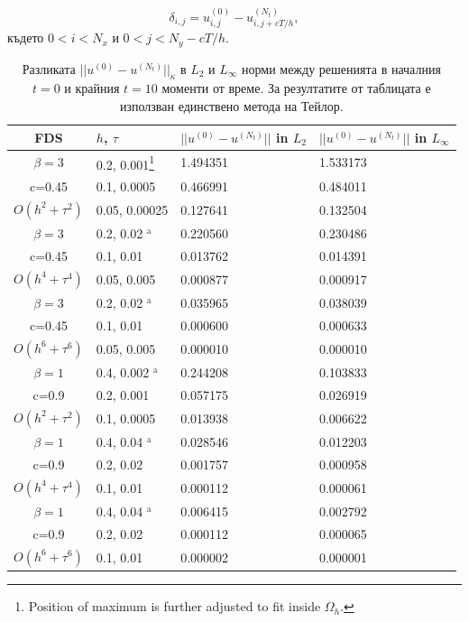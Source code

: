 \documentclass{article}
\begin{document}
$$ \delta_{i,j} = u_{i,j}^{(0)} - u_{i,j+cT/h}^{(N_t)},$$
където $0 < i < N_x$ и $0 < j < N_y - cT/h$. 
\begin{table}[ht]
\centering
\small
		\begin{tabular}{||c|l|l|l||}
			\hline
			\hline
      FDS        & $h$, $\tau$  & $||u^{(0)} - u^{(N_t)}||$ in $L_2$  & $||u^{(0)} - u^{(N_t)}||$ in $L_\infty$   \\
   		\hline 
			\hline
  $\beta=3$                &0.2, 0.001\footnote{Position of maximum is further adjusted to fit inside $\Omega_h$.}            & 1.494351 & 1.533173    \\
   c=0.45                     &0.1, 0.0005          & 0.466991 & 0.484011       \\
     $O(h^2 + \tau^ 2)$ &0.05, 0.00025   & 0.127641 & 0.132504      \\
			\hline 
  $\beta=3$               &0.2, 0.02 $^{\text{a}}$      &0.220560 & 0.230486       \\
   c=0.45                    &0.1, 0.01      &0.013762 & 0.014391        \\
     $O(h^4+ \tau^4)$ &0.05, 0.005&0.000877 & 0.000917         \\
			\hline 
  $\beta=3$               &0.2, 0.02 $^{\text{a}}$       &  0.035965 & 0.038039        \\
     c=0.45                 &0.1, 0.01        &0.000600 & 0.000633       \\
     $O(h^6+ \tau^6)$ &0.05, 0.005 &0.000010 & 0.000010          \\
	   \hline
			\hline 
       $\beta=1$       &0.4, 0.002 $^{\text{a}}$       & 0.244208 & 0.103833 \\
                  c=0.9    &0.2, 0.001       &  0.057175 & 0.026919  \\
  $O(h^2+ \tau^2)$ &0.1, 0.0005   & 0.013938 & 0.006622  \\
			\hline
      $\beta=1$               &0.4, 0.04 $^{\text{a}}$    &0.028546 & 0.012203 \\
       c=0.9                     &0.2, 0.02     & 0.001757 & 0.000958     \\
       $O(h^4+ \tau^4)$ &0.1, 0.01   & 0.000112 & 0.000061   \\
    \hline
  $\beta=1$                  &0.4, 0.04 $^{\text{a}}$   &0.006415 & 0.002792  \\
      c=0.9                    &0.2, 0.02   &0.000112 & 0.000065     \\
     $O(h^6+ \tau^6)$ &0.1, 0.01 & 0.000002 & 0.000001         \\
	   \hline
			\hline 
		\end{tabular}
		\caption{Разликата $||u^{(0)} - u^{(N_t)}||_\kappa$ в $L_2$ и $L_\infty$ норми между решенията в началния $t=0$ и крайния $t=10$ моменти от време. За резултатите от таблицата е използван единствено метода на Тейлор.}
\label{tableG}
\end{table}
\end{document}
